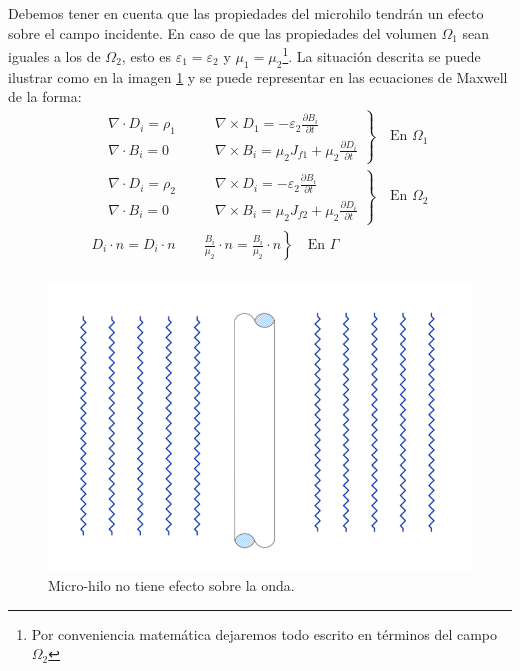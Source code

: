 \documentclass[11pt]{article}
\begin{document}
Debemos tener en cuenta que las propiedades del microhilo tendrán un efecto sobre el campo incidente. En caso de que las propiedades del volumen $\Omega_1$ sean iguales a los de $\Omega_2$, esto es $\varepsilon_1=\varepsilon_2$ y $\mu_1=\mu_2$\footnote{Por conveniencia matemática dejaremos todo escrito en términos del campo $\Omega_2$}. La situación descrita se puede ilustrar como en la imagen \ref{fig:Onda no afectada} y se puede representar en las ecuaciones de Maxwell de la forma:
\begin{equation}
\label{eq:Onda no afectada}
\begin{split}
\left.
\begin{aligned}
&\nabla\cdot D_i = \rho_1\qquad & \nabla\times D_1 = -\varepsilon_2\frac{\partial B_i}{\partial t}\\
&\nabla\cdot B_i = 0\qquad & \nabla\times B_i = \mu_2 J_{f1}+\mu_2\frac{\partial D_i}{\partial t}
\end{aligned}
\right\}
\quad\text{En }\Omega_1\\
\left.
\begin{aligned}
&\nabla\cdot D_i = \rho_2\qquad & \nabla\times D_i = -\varepsilon_2\frac{\partial B_i}{\partial t}\\
&\nabla\cdot B_i = 0\qquad & \nabla\times B_i = \mu_2 J_{f2}+\mu_2\frac{\partial D_i}{\partial t}
\end{aligned}
\right\}
\quad\text{En }\Omega_2\\
\left. 
D_i\cdot n=D_i\cdot n \qquad \frac{B_i}{\mu_2}\cdot n=\frac{B_i}{\mu_2}\cdot n
\right\}
\quad\text{En }\Gamma\\
\end{split}
\end{equation}
\begin{figure}[H]
\centering
\includegraphics[width=16cm]{Imagenes/ondaincidente2.png}
\caption{Micro-hilo no tiene efecto sobre la onda.}\label{fig:Onda no afectada}
\end{figure}
\end{document}
